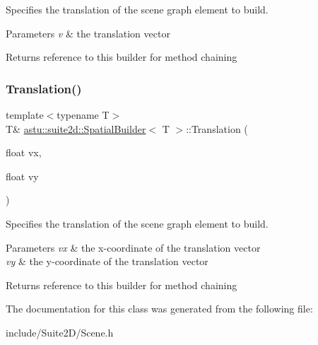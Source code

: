 Specifies the translation of the scene graph element to build.


\begin{DoxyParams}{Parameters}
{\em v} & the translation vector \\
\hline
\end{DoxyParams}
\begin{DoxyReturn}{Returns}
reference to this builder for method chaining 
\end{DoxyReturn}
\mbox{\label{classastu_1_1suite2d_1_1SpatialBuilder_a5e5638a6a92f89fdcbf5da0d5fb2490a}} 
\subsubsection{\texorpdfstring{Translation()}{Translation()}\hspace{0.1cm}{\footnotesize\ttfamily [2/2]}}
{\footnotesize\ttfamily template$<$typename T$>$ \\
T\& \hyperlink{classastu_1_1suite2d_1_1SpatialBuilder}{astu\+::suite2d\+::\+Spatial\+Builder}$<$ T $>$\+::Translation (\begin{DoxyParamCaption}\item[{float}]{vx,  }\item[{float}]{vy }\end{DoxyParamCaption})\hspace{0.3cm}{\ttfamily [inline]}}

Specifies the translation of the scene graph element to build.


\begin{DoxyParams}{Parameters}
{\em vx} & the x-\/coordinate of the translation vector \\
\hline
{\em vy} & the y-\/coordinate of the translation vector \\
\hline
\end{DoxyParams}
\begin{DoxyReturn}{Returns}
reference to this builder for method chaining 
\end{DoxyReturn}


The documentation for this class was generated from the following file\+:\begin{DoxyCompactItemize}
\item 
include/\+Suite2\+D/Scene.\+h\end{DoxyCompactItemize}
